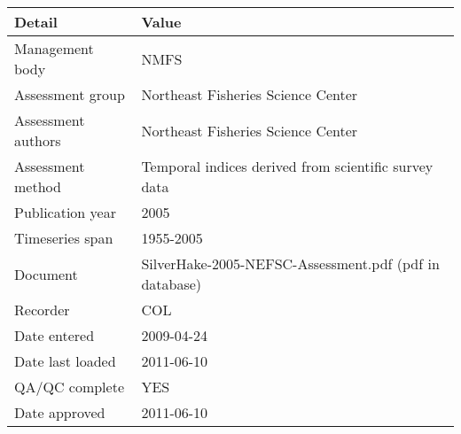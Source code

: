 \begin{table}[htb]
\centering
\begin{tabular}{lp{7cm}}
\toprule
Detail & Value \\
\midrule
Management body    & NMFS                                                   \\
Assessment group   & Northeast Fisheries Science Center                     \\
Assessment authors & Northeast Fisheries Science Center                     \\
Assessment method  & Temporal indices derived from scientific survey data   \\
Publication year   & 2005                                                   \\
Timeseries span    & 1955-2005                                              \\
Document           & SilverHake-2005-NEFSC-Assessment.pdf (pdf in database) \\
Recorder           & COL                                                    \\
Date entered       & 2009-04-24                                             \\
Date last loaded   & 2011-06-10                                             \\
QA/QC complete     & YES                                                    \\
Date approved      & 2011-06-10                                             \\
\bottomrule
\end{tabular}
\label{tab:assessdet}
\end{table}
